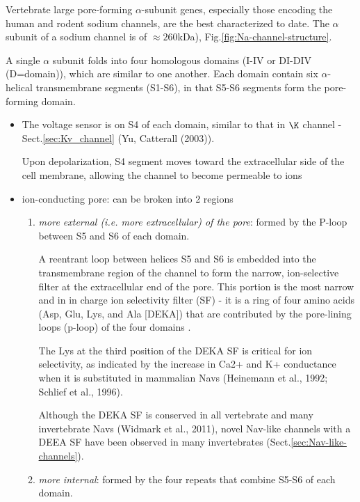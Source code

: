 Vertebrate large pore-forming $\alpha$-subunit genes, especially those encoding
the human and rodent sodium channels, are the best characterized to date.  The
$\alpha$ subunit of a sodium channel is of $\approx 260$kDa),
Fig.\ref{fig:Na-channel-structure}.

A single $\alpha$ subunit folds into four homologous domains (I-IV or DI-DIV
(D=domain)), which are similar to one another. Each domain contain six
$\alpha$-helical transmembrane segments (S1-S6), in that S5-S6 segments form the
pore-forming domain. 
 
\begin{itemize}

  \item The voltage sensor is on S4 of each domain, similar to that in $\K$
channel - Sect.\ref{sec:Kv_channel} (Yu, Catterall (2003)).

Upon depolarization, S4 segment moves toward the extracellular side of the
cell membrane, allowing the channel to become permeable to ions

  \item ion-conducting pore: can be broken into 2 regions
  
  \begin{enumerate}
    \item {\it more external (i.e. more extracellular) of the pore}: formed by
    the P-loop between S5 and S6 of each domain.

  A reentrant loop between helices S5 and S6 is embedded into the transmembrane
  region of the channel to form the narrow, ion-selective filter at the
  extracellular end of the pore.
  This portion is the most narrow and in in charge ion selectivity filter (SF) -
  it is a ring of four amino acids (Asp, Glu, Lys, and Ala [DEKA]) that are
  contributed by the pore-lining loops (p-loop) of the four domains
  \citep{catterall2000}.

  The Lys at the third position of the DEKA SF is critical for ion selectivity,
  as indicated by the increase in Ca2+ and K+ conductance when it is substituted
  in mammalian Navs (Heinemann et al., 1992; Schlief et al., 1996).

  Although the DEKA SF is conserved in all vertebrate and many invertebrate Navs
  (Widmark et al., 2011), novel Nav-like channels with a DEEA SF have been
  observed in many invertebrates (Sect.\ref{sec:Nav-like-channels}).
    
  
    \item {\it more internal}: formed by the four repeats that combine S5-S6 of
    each domain.


\end{enumerate}
\end{itemize}
